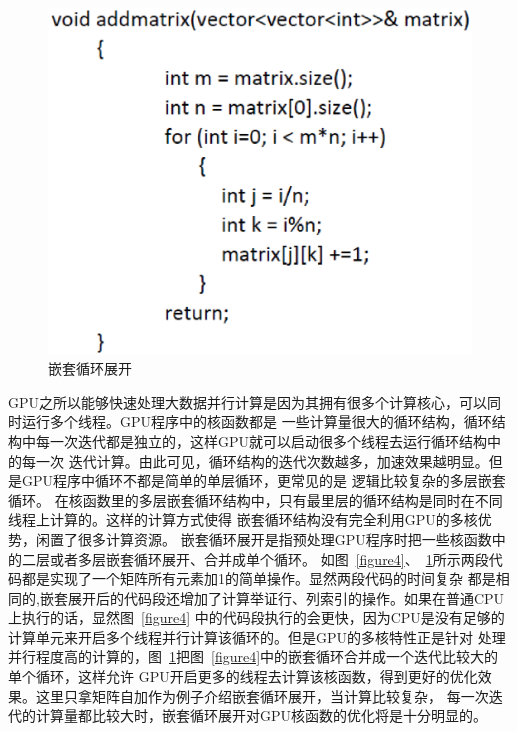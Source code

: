 \begin{figure}[!h]
\centering
\includegraphics[width=0.8\linewidth]{figure5.eps}
\caption{嵌套循环展开}\label{figure5}
\end{figure}
GPU之所以能够快速处理大数据并行计算是因为其拥有很多个计算核心，可以同时运行多个线程。GPU程序中的核函数都是
一些计算量很大的循环结构，循环结构中每一次迭代都是独立的，这样GPU就可以启动很多个线程去运行循环结构中的每一次
迭代计算。由此可见，循环结构的迭代次数越多，加速效果越明显。但是GPU程序中循环不都是简单的单层循环，更常见的是
逻辑比较复杂的多层嵌套循环。
在核函数里的多层嵌套循环结构中，只有最里层的循环结构是同时在不同线程上计算的。这样的计算方式使得
嵌套循环结构没有完全利用GPU的多核优势，闲置了很多计算资源。
嵌套循环展开是指预处理GPU程序时把一些核函数中的二层或者多层嵌套循环展开、合并成单个循环。
如图~\ref{figure4}、~\ref{figure5}所示两段代码都是实现了一个矩阵所有元素加1的简单操作。显然两段代码的时间复杂
都是相同的,嵌套展开后的代码段还增加了计算举证行、列索引的操作。如果在普通CPU上执行的话，显然图~\ref{figure4}
中的代码段执行的会更快，因为CPU是没有足够的计算单元来开启多个线程并行计算该循环的。但是GPU的多核特性正是针对
处理并行程度高的计算的，图~\ref{figure5}把图~\ref{figure4}中的嵌套循环合并成一个迭代比较大的单个循环，这样允许
GPU开启更多的线程去计算该核函数，得到更好的优化效果。这里只拿矩阵自加作为例子介绍嵌套循环展开，当计算比较复杂，
每一次迭代的计算量都比较大时，嵌套循环展开对GPU核函数的优化将是十分明显的。


